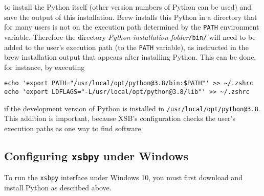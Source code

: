 \noindent
to install the Python itself (other version numbers of Python can be used)
and save the output of this installation.  Brew installs this Python in a
directory that for many users is not on the execution path determined by
the \texttt{PATH} environment variable.  Therefore the directory
\emph{Python-installation-folder}\texttt{/bin/} will need to be added to
the user's execution path (to the \texttt{PATH} variable), as instructed in
the brew installation output that appears after installing Python.
This can be done, for instance, by executing
\begin{verbatim}
echo 'export PATH="/usr/local/opt/python@3.8/bin:$PATH"' >> ~/.zshrc
echo 'export LDFLAGS="-L/usr/local/opt/python@3.8/lib"' >> ~/.zshrc
\end{verbatim}
if the development version of
Python is installed in \texttt{/usr/local/opt/python@3.8}. This
addition is important, because XSB's configuration checks the user's
execution paths as one way to find software.

%
%
%
%
%
\subsection{Configuring {\tt xsbpy} under Windows}

To run the {\tt xsbpy} interface under Windows 10, you must first
download and install Python as described above.

